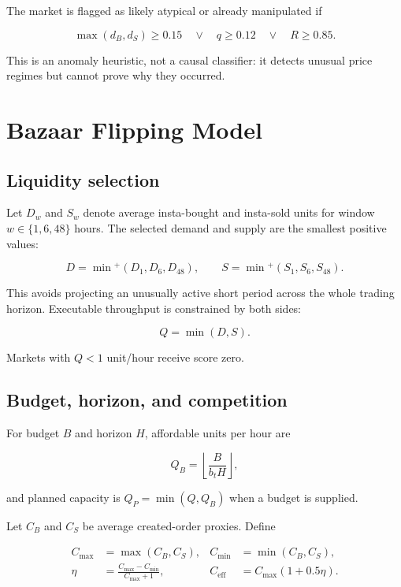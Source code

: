 \documentclass[11pt,a4paper]{article}
\begin{document}
The market is flagged as likely atypical or already manipulated if

\begin{equation}
\max(d_B,d_S)\ge0.15
\quad\lor\quad q\ge0.12
\quad\lor\quad R\ge0.85.
\end{equation}

This is an anomaly heuristic, not a causal classifier: it detects unusual price regimes but
cannot prove why they occurred.

\section{Bazaar Flipping Model}

\subsection{Liquidity selection}

Let $D_w$ and $S_w$ denote average insta-bought and insta-sold units for window
$w\in\{1,6,48\}$ hours. The selected demand and supply are the smallest positive values:

\begin{equation}
D=\min{}^+(D_1,D_6,D_{48}),\qquad
S=\min{}^+(S_1,S_6,S_{48}).
\end{equation}

This avoids projecting an unusually active short period across the whole trading horizon.
Executable throughput is constrained by both sides:

\begin{equation}
Q=\min(D,S).
\end{equation}

Markets with $Q<1$ unit/hour receive score zero.

\subsection{Budget, horizon, and competition}

For budget $B$ and horizon $H$, affordable units per hour are

\begin{equation}
Q_B=\left\lfloor\frac{B}{b_tH}\right\rfloor,
\end{equation}

and planned capacity is $Q_P=\min(Q,Q_B)$ when a budget is supplied.

Let $C_B$ and $C_S$ be average created-order proxies. Define

\begin{align}
C_{\max}&=\max(C_B,C_S),& C_{\min}&=\min(C_B,C_S),\\
\eta&=\frac{C_{\max}-C_{\min}}{C_{\max}+1},&
C_{\mathrm{eff}}&=C_{\max}(1+0.5\eta).
\end{align}
\end{document}
